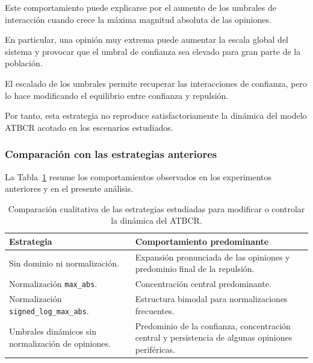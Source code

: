 \documentclass[11pt,a4paper]{article}
\begin{document}
Este comportamiento puede explicarse por el aumento de los umbrales de interacción cuando crece la máxima magnitud absoluta de las opiniones.

En particular, una opinión muy extrema puede aumentar la escala global del sistema y provocar que el umbral de confianza sea elevado para gran parte de la población.

El escalado de los umbrales permite recuperar las interacciones de confianza, pero lo hace modificando el equilibrio entre confianza y repulsión.

Por tanto, esta estrategia no reproduce satisfactoriamente la dinámica del modelo ATBCR acotado en los escenarios estudiados.

\subsubsection{Comparación con las estrategias anteriores}

La Tabla~\ref{tab:exp07_comparacion} resume los comportamientos observados en los experimentos anteriores y en el presente análisis.

\begin{table}[htbp]
    \centering
    \caption{Comparación cualitativa de las estrategias estudiadas para modificar o controlar la dinámica del ATBCR.}
    \label{tab:exp07_comparacion}
    \small

    \begin{tabular}{>{\raggedright\arraybackslash}p{} >{\raggedright\arraybackslash}p{}}
    \toprule
    \textbf{Estrategia}
    &
    \textbf{Comportamiento predominante}
    \\
    \midrule
    Sin dominio ni normalización.
    &
    Expansión pronunciada de las opiniones
    y predominio final de la repulsión.
    \\

    Normalización \texttt{max\_abs}.
    &
    Concentración central predominante.
    \\

    Normalización \texttt{signed\_log\_max\_abs}.
    &
    Estructura bimodal para
    normalizaciones frecuentes.
    \\


    Umbrales dinámicos sin normalización de opiniones.
    &
    Predominio de la confianza, concentración central y persistencia de algunas opiniones periféricas.
    \\

    \bottomrule
    \end{tabular}
\end{table}
\end{document}
